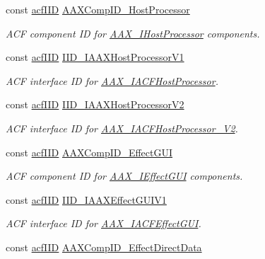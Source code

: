 \begin{Indent}
\begin{DoxyCompactItemize}
const \mbox{\hyperlink{a00269_a59df0b41744eee7a066787aaedf97f67}{acf\+I\+ID}} \mbox{\hyperlink{a00683_a166521f91afbd59c15651f6cd6c50948}{A\+A\+X\+Comp\+I\+D\+\_\+\+Host\+Processor}}
\begin{DoxyCompactList}\small\item\em A\+CF component ID for \mbox{\hyperlink{a01833}{A\+A\+X\+\_\+\+I\+Host\+Processor}} components. \end{DoxyCompactList}\item 
const \mbox{\hyperlink{a00269_a59df0b41744eee7a066787aaedf97f67}{acf\+I\+ID}} \mbox{\hyperlink{a00683_af605d0ce41316c8195aea193a2b50428}{I\+I\+D\+\_\+\+I\+A\+A\+X\+Host\+Processor\+V1}}
\begin{DoxyCompactList}\small\item\em A\+CF interface ID for \mbox{\hyperlink{a01693}{A\+A\+X\+\_\+\+I\+A\+C\+F\+Host\+Processor}}. \end{DoxyCompactList}\item 
const \mbox{\hyperlink{a00269_a59df0b41744eee7a066787aaedf97f67}{acf\+I\+ID}} \mbox{\hyperlink{a00683_a8b54f0c7603c5f10f588d29307769a48}{I\+I\+D\+\_\+\+I\+A\+A\+X\+Host\+Processor\+V2}}
\begin{DoxyCompactList}\small\item\em A\+CF interface ID for \mbox{\hyperlink{a01697}{A\+A\+X\+\_\+\+I\+A\+C\+F\+Host\+Processor\+\_\+\+V2}}. \end{DoxyCompactList}\item 
const \mbox{\hyperlink{a00269_a59df0b41744eee7a066787aaedf97f67}{acf\+I\+ID}} \mbox{\hyperlink{a00683_aefb6e005966bfdb62469adea5fc55237}{A\+A\+X\+Comp\+I\+D\+\_\+\+Effect\+G\+UI}}
\begin{DoxyCompactList}\small\item\em A\+CF component ID for \mbox{\hyperlink{a01821}{A\+A\+X\+\_\+\+I\+Effect\+G\+UI}} components. \end{DoxyCompactList}\item 
const \mbox{\hyperlink{a00269_a59df0b41744eee7a066787aaedf97f67}{acf\+I\+ID}} \mbox{\hyperlink{a00683_a525360a79307aa2771a000431e2179f4}{I\+I\+D\+\_\+\+I\+A\+A\+X\+Effect\+G\+U\+I\+V1}}
\begin{DoxyCompactList}\small\item\em A\+CF interface ID for \mbox{\hyperlink{a01665}{A\+A\+X\+\_\+\+I\+A\+C\+F\+Effect\+G\+UI}}. \end{DoxyCompactList}\item 
const \mbox{\hyperlink{a00269_a59df0b41744eee7a066787aaedf97f67}{acf\+I\+ID}} \mbox{\hyperlink{a00683_a738ef512d18e611e103c797e2d3cfd3a}{A\+A\+X\+Comp\+I\+D\+\_\+\+Effect\+Direct\+Data}}

\end{DoxyCompactItemize}
\end{Indent}
